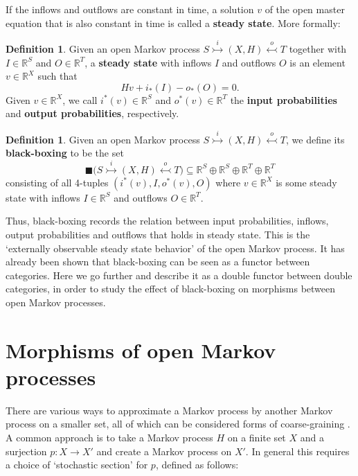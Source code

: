 \documentclass[oneside,final]{ucr}
\theoremstyle{definition}
\newtheorem{definition}[theorem]{Definition}
\newcommand{\maps}{\colon}
\newcommand{\R}{\mathbb{R}}
\newcommand{\define}[1]{{\bf \boldmath #1}}
\begin{document}
{If the inflows and outflows are constant in time, a solution $v$ of the open master equation
that is also constant in time is called a \define{steady state}. More formally:

\begin{definition}
Given an open Markov process $S \stackrel{i}{\rightarrowtail} (X,H) \stackrel{o}{\leftarrowtail} T$ together with $I \in \R^S$ and $O \in \R^T$, a \define{steady state} with inflows $I$ and outflows $O$ is an element $v \in \R^X$ such that 
\[     H v + i_*(I) - o_*(O) = 0 .\]   
Given $v \in \R^X$, we call $i^*(v) \in \R^S$ and $o^*(v) \in \R^T$ the 
\define{input probabilities} and \define{output probabilities}, respectively.
\end{definition}

\begin{definition}
\label{defn:black-boxing}
Given an open Markov process $S \stackrel{i}{\rightarrowtail} (X,H) \stackrel{o}{\leftarrowtail} T$, we define its \define{black-boxing} to be the set
\[   \blacksquare\big(S \stackrel{i}{\rightarrowtail} (X,H) \stackrel{o}{\leftarrowtail} T\big) 
\subseteq \R^S \oplus \R^S \oplus \R^T \oplus \R^T \]
consisting of all 4-tuples $(i^*(v),I,o^*(v),O)$ where $v \in \R^X$ is some steady state
with inflows $I \in \R^S$ and outflows $O \in \R^T$.
\end{definition}

Thus, black-boxing records the relation between input probabilities, inflows, output probabilities and outflows that holds in steady state.  This is the `externally observable steady state behavior' of the open Markov process.   It has already been shown \cite{BFP,BP} that black-boxing can be seen as a functor between categories.    Here we go further and describe it as a double functor between double categories, in order to study the effect of black-boxing on morphisms between open Markov processes.

\section{Morphisms of open Markov processes}

There are various ways to approximate a Markov process by another Markov process on a smaller set, all of which can be considered forms of coarse-graining \cite{Buchholz}.  A common approach is to take a Markov process $H$ on a finite set $X$ and a surjection $p \maps X \to X'$ and create a Markov process on $X'$.   In general this requires a choice of `stochastic section' for $p$, defined as follows:

}
\end{document}

